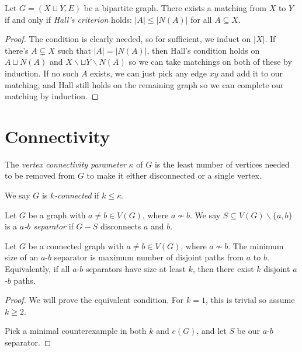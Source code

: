 \documentclass[a3paper, 10pt]{article}
\renewcommand{\vocab}[1]{\emph{#1}}
\begin{document}
\begin{multicols*}{5}
\begin{theorem}[Hall]
    Let $G = (X \sqcup Y, E)$ be a bipartite graph. There exists a matching from $X$ to $Y$ if and only if \vocab{Hall's criterion} holds: $|A| \leq |N(A)|$ for all $A \subseteq X$.
\end{theorem}
\begin{proof}
    The condition is clearly needed, so for sufficient, we induct on $|X|$. If there's $A \subsetneq X$ such that $|A| = |N(A)|$, then Hall's condition holds on $A \sqcup N(A)$ and $X\backslash \sqcup Y\backslash N(A)$ so we can take matchings on both of these by induction. If no such $A$ exists, we can just pick any edge $xy$ and add it to our matching, and Hall still holds on the remaining graph so we can complete our matching by induction. 
\end{proof}

\section{Connectivity}

\begin{definition}
The \vocab{vertex connectivity parameter} $\kappa$ of $G$ is the least number of vertices needed to be removed from $G$ to make it either disconnected or a single vertex.

We say $G$ is \vocab{$k$-connected} if $k \leq \kappa$.
\end{definition}

\begin{definition}
    Let $G$ be a graph with $a \neq b \in V(G)$, where $a \not \sim b$. We say $S \subseteq V(G) \backslash \{a, b\}$ is a \vocab{$a$-$b$ separator} if $G - S$ disconnects $a$ and $b$.
\end{definition}

\begin{theorem}
    Let $G$ be a connected graph with $a \neq b \in V(G)$, where $a \not \sim b$.
    The minimum size of an $a$-$b$ separator is maximum number of disjoint paths from $a$ to $b$. Equivalently, if all $a$-$b$ separators have size at least $k$, then there exist $k$ disjoint $a$-$b$ paths.
\end{theorem}
\begin{proof}
    We will prove the equivalent condition. For $k = 1$, this is trivial so assume $k \geq 2$.

    Pick a minimal counterexample in both $k$ and $e(G)$, and let $S$ be our $a$-$b$ separator.


\end{proof}
\end{multicols*}
\end{document}
